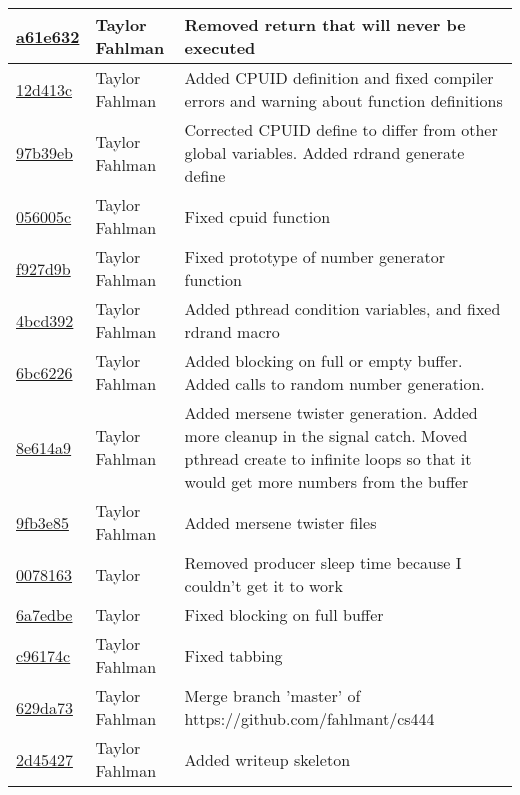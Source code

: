 \begin{tabular}{l l l}
\href{https://github.com/fahlmant/cs444/commit/a61e6320173be1ea668966396bb45bc7930d34f9}{a61e632} & Taylor Fahlman & Removed return that will never be executed\\\hline
\href{https://github.com/fahlmant/cs444/commit/12d413cdbc773bea9797fbc8ffc523df368cae5c}{12d413c} & Taylor Fahlman & Added CPUID definition and fixed compiler errors and warning about function definitions\\\hline
\href{https://github.com/fahlmant/cs444/commit/97b39ebde5ea4090c9371d7868ec9984c6230703}{97b39eb} & Taylor Fahlman & Corrected CPUID define to differ from other global variables. Added rdrand generate define\\\hline
\href{https://github.com/fahlmant/cs444/commit/056005ccb725e1ce91c211bb5cc71acdd3cfe5e4}{056005c} & Taylor Fahlman & Fixed cpuid function\\\hline
\href{https://github.com/fahlmant/cs444/commit/f927d9b39907620e959c235c9b56ab0160bbc366}{f927d9b} & Taylor Fahlman & Fixed prototype of number generator function\\\hline
\href{https://github.com/fahlmant/cs444/commit/4bcd392bf2941eb49cc82229be9495cd4c9f62ee}{4bcd392} & Taylor Fahlman & Added pthread condition variables, and fixed rdrand macro\\\hline
\href{https://github.com/fahlmant/cs444/commit/6bc6226e01a9a1302c741331cce8ab8256f399ce}{6bc6226} & Taylor Fahlman & Added blocking on full or empty buffer. Added calls to random number generation.\\\hline
\href{https://github.com/fahlmant/cs444/commit/8e614a90d9b3adfedea1214253801c36f17c6aea}{8e614a9} & Taylor Fahlman & Added mersene twister generation. Added more cleanup in the signal catch. Moved pthread create to infinite loops so that it would get more numbers from the buffer\\\hline
\href{https://github.com/fahlmant/cs444/commit/9fb3e850a20f58cd174a80bf580c150ebb8a8860}{9fb3e85} & Taylor Fahlman & Added mersene twister files\\\hline
\href{https://github.com/fahlmant/cs444/commit/007816390983ac7d562e8f9d4d31ff6abc7c40c8}{0078163} & Taylor & Removed producer sleep time because I couldn't get it to work\\\hline
\href{https://github.com/fahlmant/cs444/commit/6a7edbe421fb5e53a9a847a09117500c1ca1482e}{6a7edbe} & Taylor & Fixed blocking on full buffer\\\hline
\href{https://github.com/fahlmant/cs444/commit/c96174c136e9194fd83f4d5fee5927432468fdfd}{c96174c} & Taylor Fahlman & Fixed tabbing\\\hline
\href{https://github.com/fahlmant/cs444/commit/629da73d1a287be9db4919d9bc27c987acfb7128}{629da73} & Taylor Fahlman & Merge branch 'master' of https://github.com/fahlmant/cs444\\\hline
\href{https://github.com/fahlmant/cs444/commit/2d454270c6b79091f4c1363da7185e3ffbcb2301}{2d45427} & Taylor Fahlman & Added writeup skeleton\\\hline\end{tabular}
